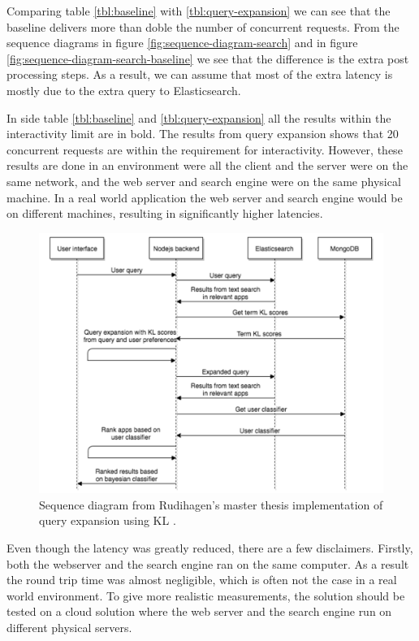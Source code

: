 Comparing table \ref{tbl:baseline} with \ref{tbl:query-expansion} we can see that the baseline delivers more than doble the number of concurrent requests.
From the sequence diagrams in figure \ref{fig:sequence-diagram-search} and in figure \ref{fig:sequence-diagram-search-baseline} we see that the difference is the extra post processing steps.
As a result, we can assume that most of the extra latency is mostly due to the extra query to Elasticsearch.

In side table \ref{tbl:baseline} and \ref{tbl:query-expansion} all the results within the interactivity limit are in bold.
The results from query expansion shows that 20 concurrent requests are within the requirement for interactivity.
However, these results are done in an environment were all the client and the server were on the same network,
and the web server and search engine were on the same physical machine.
In a real world application the web server and search engine would be on different machines,
resulting in significantly higher latencies.

\begin{figure}[h!]
\centering \includegraphics[width=0.9\linewidth]{img/sequence-diagram-search-master-thesis.png}
\caption{Sequence diagram from Rudihagen's master thesis implementation of query expansion using KL \cite[p. 37]{master-thesis}.}
\label{fig:sequence-diagram-search-master}
\end{figure}

Even though the latency was greatly reduced, there are a few disclaimers.
Firstly, both the webserver and the search engine ran on the same computer.
As a result the round trip time was almost negligible, which is often not the case in a real world environment.
To give more realistic measurements, the solution should be tested on a cloud solution where the web server and the search engine run on different physical servers.

